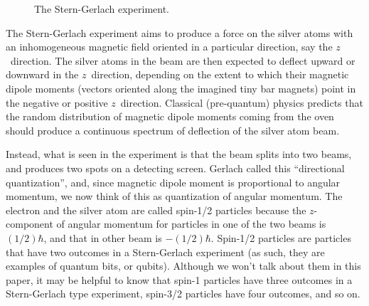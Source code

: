 \documentclass{eptcs}
\begin{document}
\begin{figure}
  \begin{center}
  \end{center}
\caption{The Stern-Gerlach experiment.}
\label{sterngerlach}
\end{figure}

The Stern-Gerlach experiment aims to produce a force on the silver atoms
with an inhomogeneous magnetic field oriented in a particular direction,
say the $z$~direction.  The silver atoms in the beam are then expected
to deflect upward or downward in the $z$~direction, depending on the extent
to which their magnetic dipole moments (vectors oriented along the imagined
tiny bar magnets) point in the negative or positive $z$~direction.
Classical (pre-quantum) physics predicts that the random distribution of
magnetic dipole moments coming from the oven should produce a continuous
spectrum of deflection of the silver atom beam.

Instead, what is seen in the experiment is that the beam splits into
two beams, and produces two spots on a detecting screen.
Gerlach called this ``directional quantization''\cite{townsend},
and, since magnetic dipole moment is proportional to angular momentum,
we now think of this as quantization of angular momentum.
The electron and the silver atom are called spin-1/2 particles
because the $z$-component of
angular momentum for particles in one of the two beams is $(1/2)\hbar$,
and that in other beam is $-(1/2)\hbar$.
Spin-1/2 particles are particles that have two outcomes in a Stern-Gerlach
experiment (as such, they are examples of quantum bits, or qubits).
Although we won't talk about them in this paper, it may be helpful
to know that spin-1 particles have three outcomes in a Stern-Gerlach type
experiment, spin-3/2 particles have four outcomes, and so on.
\end{document}
